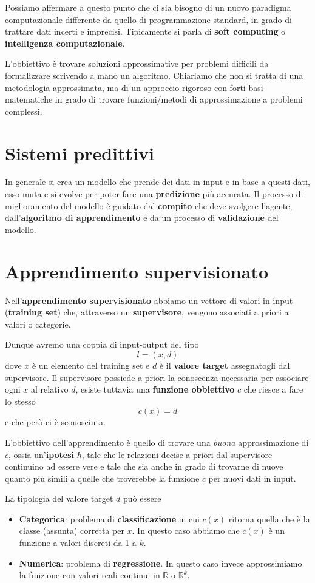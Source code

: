Possiamo affermare a questo punto che ci sia bisogno di un nuovo paradigma computazionale differente da quello di
programmazione standard, in grado di trattare dati incerti e imprecisi. Tipicamente si parla di \textbf{soft computing} o
\textbf{intelligenza computazionale}.

L'obbiettivo \`e trovare soluzioni approssimative per problemi difficili da formalizzare scrivendo a mano un algoritmo.
Chiariamo che non si tratta di una metodologia approssimata, ma di un approccio rigoroso con forti basi
matematiche in grado di trovare funzioni/metodi di approssimazione a problemi complessi.

\section{Sistemi predittivi}
In generale si crea un modello che prende dei dati in input e in base a questi dati, esso muta e si evolve per poter
fare una \textbf{predizione} pi\`u accurata. Il processo di miglioramento del modello \`e guidato dal \textbf{compito}
che deve svolgere l'agente, dall'\textbf{algoritmo di apprendimento} e da un processo di \textbf{validazione} del modello.

\section{Apprendimento supervisionato}
Nell'\textbf{apprendimento supervisionato} abbiamo un vettore di valori in input (\textbf{training set}) che, attraverso
un \textbf{supervisore}, vengono associati a priori a valori o categorie.

Dunque avremo una coppia di input-output del tipo
\[ l = (x, d) \]
dove $x$ \`e un elemento del training set e $d$ \`e il \textbf{valore target} assegnatogli dal supervisore.
Il supervisore possiede a priori la conoscenza necessaria per associare ogni $x$ al relativo $d$, esiste tuttavia una
\textbf{funzione obbiettivo} $c$ che riesce a fare lo stesso
\[ c(x) = d \]
e che per\`o ci \`e sconosciuta.

L'obbiettivo dell'apprendimento \`e quello di trovare una \emph{buona} approssimazione di $c$, ossia un'\textbf{ipotesi}
$h$, tale che le relazioni decise a priori dal supervisore continuino ad essere vere e tale che sia anche in grado di
trovarne di nuove quanto pi\`u simili a quelle che troverebbe la funzione $c$ per nuovi dati in input.

La tipologia del valore target $d$ pu\`o essere
\begin{itemize}
	\item \textbf{Categorica}: problema di \textbf{classificazione} in cui $c(x)$ ritorna quella che \`e la classe
	      (assunta) corretta per $x$. In questo caso abbiamo che $c(x)$ \`e un funzione a valori discreti da 1 a $k$.
	\item \textbf{Numerica}: problema di \textbf{regressione}. In questo caso invece approssimiamo la funzione con
	      valori reali continui in $\mathbb{R}$ o $\mathbb{R}^k$.
\end{itemize}

